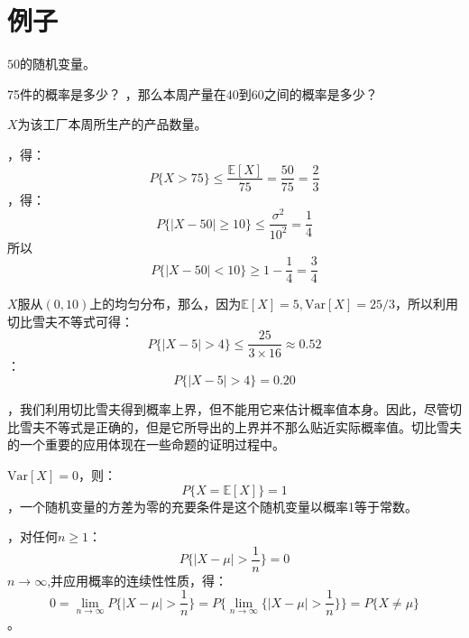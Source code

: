 \documentclass[UTF8]{article}
\begin{document}
\section{例子}
\(50\)的随机变量。
\begin{enumerate}
	75件的概率是多少？
	，那么本周产量在40到60之间的概率是多少？
\end{enumerate}
\begin{shaded} 
	\(X\)为该工厂本周所生产的产品数量。
	\begin{enumerate}
		，得：\[ P\{ X > 75\} \leq \frac{\mathbb{E}[X]}{75} = \frac{50}{75} = \frac{2}{3}\]
		，得：\[ P\{ |X-50| \geq 10 \} \leq \frac{\sigma^{2}}{10^{2}} =\frac{1}{4} \]所以\[P\{ |X -50| < 10 \}\geq 1- \frac{1}{4} = \frac{3}{4}\]
	\end{enumerate}
	\(X\)服从\((0,10)\)上的均匀分布，那么，因为\(\mathbb{E}[X] = 5, \mathrm{Var}[X]= 25/3\)，所以利用切比雪夫不等式可得：
	\begin{equation}
	\label{eq:8}
	P\{ |X-5| > 4 \} \leq \frac{25}{3\times 16} \approx 0.52
	\end{equation}
	：
	\begin{equation}
	\label{eq:9}
	P\{ |X-5| > 4 \} = 0.20
	\end{equation}
\end{shaded}
，我们利用切比雪夫得到概率上界，但不能用它来估计概率值本身。因此，尽管切比雪夫不等式是正确的，但是它所导出的上界并不那么贴近实际概率值。切比雪夫的一个重要的应用体现在一些命题的证明过程中。
\begin{shaded} 
	\(\mathrm{Var}[X] = 0\)，则：
	\begin{equation}
	\label{eq:10}
	P\{X = \mathbb{E}[X]\} = 1
	\end{equation}
	，一个随机变量的方差为零的充要条件是这个随机变量以概率1等于常数。
\end{shaded}
\begin{shaded} 
	，对任何\(n\geq 1\)：
	\begin{equation}
	\label{eq:11}
	P\{ |X - \mu| > \frac{1}{n} \} = 0
	\end{equation}
	\(n\to \infty\),并应用概率的连续性性质，得：
	\begin{equation}
	\label{eq:12}
	0 = \lim_{n\to\infty}P\{ |X-\mu| > \frac{1}{n} \} = P\{\lim_{n\to\infty}\{ |X-\mu| > \frac{1}{n} \}\} = P\{X\neq \mu\}
	\end{equation}
	。
\end{shaded}
\end{document}
